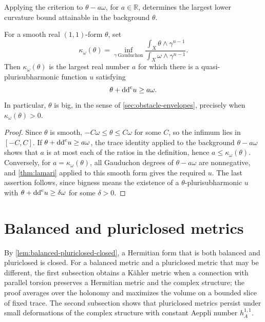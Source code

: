 Applying the criterion to $\theta-a\omega$, for $a\in\mathbb R$, determines the largest lower curvature bound attainable in the background $\theta$.

\begin{corollary}\label{cor:gauduchon-threshold}
For a smooth real $(1,1)$-form $\theta$, set
\[
 \kappa_\omega(\theta)=
 \inf_{\gamma\ \mathrm{Gauduchon}}
 \frac{\int_X\theta\wedge\gamma^{n-1}}
      {\int_X\omega\wedge\gamma^{n-1}}.
\]
Then $\kappa_\omega(\theta)$ is the largest real number $a$ for which there is a quasi-plurisubharmonic function $u$ satisfying
\[
 \theta+\mathrm{dd}^{\mathrm{c}} u\geq a\omega.
\]
In particular, $\theta$ is big, in the sense of \cref{sec:obstacle-envelopes}, precisely when $\kappa_\omega(\theta)>0$.
\end{corollary}
\begin{proof}
Since $\theta$ is smooth, $-C\omega\leq\theta\leq C\omega$ for some $C$, so the infimum lies in $[-C,C]$. If $\theta+\mathrm{dd}^{\mathrm{c}} u\geq a\omega$, the trace identity applied to the background $\theta-a\omega$ shows that $a$ is at most each of the ratios in the definition, hence $a\leq\kappa_\omega(\theta)$. Conversely, for $a=\kappa_\omega(\theta)$, all Gauduchon degrees of $\theta-a\omega$ are nonnegative, and \cref{thm:lamari} applied to this smooth form gives the required $u$. The last assertion follows, since bigness means the existence of a $\theta$-plurisubharmonic $u$ with $\theta+\mathrm{dd}^{\mathrm{c}} u\geq\delta\omega$ for some $\delta>0$.
\end{proof}





\section{Balanced and pluriclosed metrics}
\label{sec:balanced-pluriclosed-metrics}

By \cref{lem:balanced-pluriclosed-closed}, a Hermitian form that is both balanced and pluriclosed is closed. For a balanced metric and a pluriclosed metric that may be different, the first subsection obtains a K\"ahler metric when a connection with parallel torsion preserves a Hermitian metric and the complex structure; the proof averages over the holonomy and maximizes the volume on a bounded slice of fixed trace. The second subsection shows that pluriclosed metrics persist under small deformations of the complex structure with constant Aeppli number $h_A^{1,1}$.

